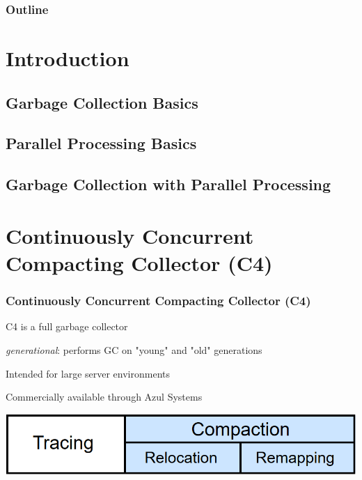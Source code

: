 \documentclass{beamer}
\newcommand{\linespace}{\vskip 0.25cm}
\begin{document}
\begin{frame}
  \frametitle{Outline}
  \tableofcontents  
\end{frame}



\section[Introduction]{Introduction}

\subsection[GC Basics]{Garbage Collection Basics}


\subsection[PP Basics]{Parallel Processing Basics}



\subsection[GC with PP]{Garbage Collection with Parallel Processing}



\section[C4]{Continuously Concurrent Compacting Collector (C4)}

\begin{frame}

\frametitle{Continuously Concurrent Compacting Collector (C4)}

C4 is a full garbage collector

\linespace
\linespace

\emph{generational}: performs GC on "young" and "old" generations

\linespace
\linespace

Intended for large server environments

\linespace
\linespace

Commercially available through Azul Systems

\linespace
\linespace
\linespace

\begin{center}
\includegraphics[width=.85\textwidth]{Illustrations/gc_cycle_locator_compaction.png}
\end{center}

\end{frame}
\end{document}
